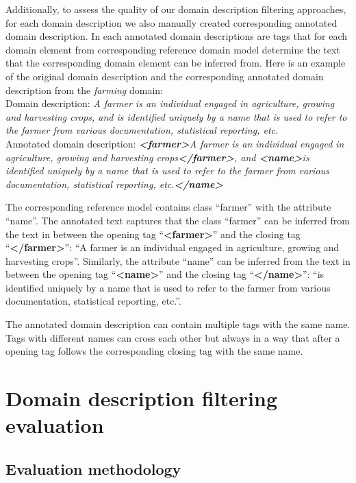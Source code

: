 Additionally, to assess the quality of our domain description filtering approaches, for each domain description we also manually created corresponding annotated domain description. In each annotated domain descriptions are tags that for each domain element from corresponding reference domain model determine the text that the corresponding domain element can be inferred from. Here is an example of the original domain description and the corresponding annotated domain description from the \emph{farming} domain: \\

\noindent{}Domain description: \textit{A farmer is an individual engaged in agriculture, growing and harvesting crops, and is identified uniquely by a name that is used to refer to the farmer from various documentation, statistical reporting, etc.} \\

\noindent{}Annotated domain description: \textit{\textbf{<farmer>}A farmer is an individual engaged in agriculture, growing and harvesting crops\textbf{</farmer>}, and \textbf{<name>}is identified uniquely by a name that is used to refer to the farmer from various documentation, statistical reporting, etc.\textbf{</name>}}

The corresponding reference model contains class ``farmer'' with the attribute ``name''. The annotated text captures that the class ``farmer'' can be inferred from the text in between the opening tag ``\textbf{<farmer>}'' and the closing tag ``\textbf{</farmer>}'': ``A farmer is an individual engaged in agriculture, growing and harvesting crops''. Similarly, the attribute ``name'' can be inferred from the text in between the opening tag ``\textbf{<name>}'' and the closing tag ``\textbf{</name>}'': ``is identified uniquely by a name that is used to refer to the farmer from various documentation, statistical reporting, etc.''.

The annotated domain description can contain multiple tags with the same name. Tags with different names can cross each other but always in a way that after a opening tag follows the corresponding closing tag with the same name.


\section{Domain description filtering evaluation}

\subsection{Evaluation methodology}


